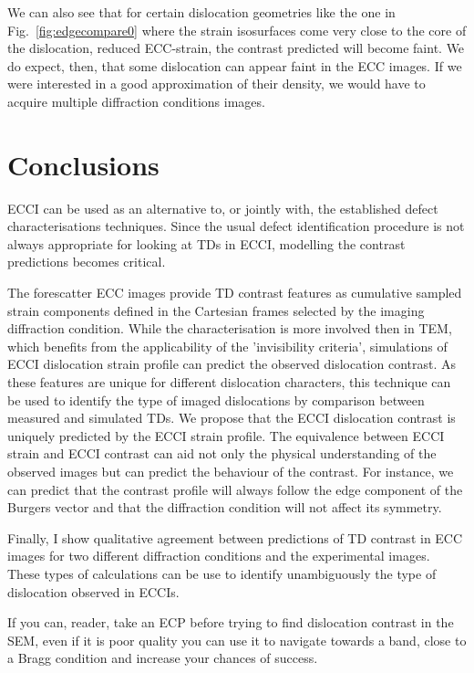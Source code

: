 We can also see that for certain dislocation geometries like the one in Fig.~\ref{fig:edgecompare0} where the strain isosurfaces come very close to the core of the dislocation, \ie reduced ECC-strain, the contrast predicted will become faint. We do expect, then, that some dislocation can appear faint in the ECC images. If we were interested in a good approximation of their density, we would have to acquire multiple diffraction conditions images. 

\pagebreak\clearpage



\section{Conclusions}
ECCI can be used as an alternative to, or jointly with, the established defect characterisations techniques. Since the usual defect identification procedure is not always appropriate for looking at TDs in ECCI, modelling the contrast predictions becomes critical. 

The forescatter ECC images provide TD contrast features as cumulative sampled strain components defined in the Cartesian frames selected by the imaging diffraction condition. While the characterisation is more involved then in TEM, which benefits from the applicability of the 'invisibility criteria', simulations of ECCI dislocation strain profile can predict the observed dislocation contrast. As these features are unique for different dislocation characters, this technique can be used to identify the type of imaged dislocations by comparison between measured and simulated TDs. We propose that the ECCI dislocation contrast is uniquely predicted by the ECCI strain profile. The equivalence between ECCI strain and ECCI contrast can aid not only the physical understanding of the observed images but can predict the behaviour of the contrast. For instance, we can predict that the contrast profile will always follow the edge component of the Burgers vector and that the diffraction condition will not affect its symmetry.


Finally, I show qualitative agreement between predictions of TD contrast in ECC images for two different diffraction conditions and the experimental images. These types of calculations can be use to identify unambiguously  the type of dislocation observed in ECCIs. 


If you can, reader, take an ECP before trying to find dislocation contrast in the SEM, even if it is poor quality you can use it to navigate towards a band, close to a Bragg condition and increase your chances of success. 



      
